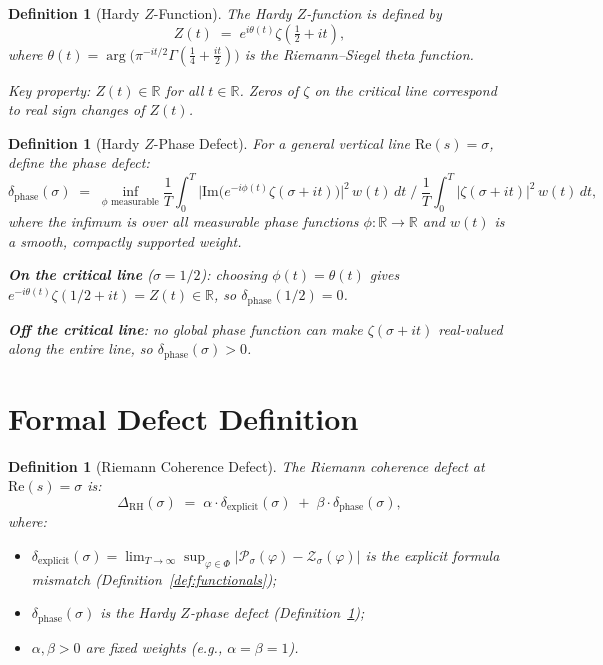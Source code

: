 \documentclass[11pt]{article}
\newtheorem{definition}[lemma]{Definition}
\theoremstyle{definition}
\begin{document}
\begin{definition}[Hardy $Z$-Function]
\label{def:hardy-z}
The Hardy $Z$-function is defined by
\[
  Z(t) \;=\; e^{i\theta(t)} \zeta(\tfrac{1}{2} + it),
\]
where $\theta(t) = \arg\bigl(\pi^{-it/2} \Gamma(\tfrac{1}{4} + \tfrac{it}{2})\bigr)$
is the Riemann--Siegel theta function.

Key property: $Z(t) \in \mathbb{R}$ for all $t \in \mathbb{R}$.
Zeros of $\zeta$ on the critical line correspond to real sign changes of $Z(t)$.
\end{definition}

\begin{definition}[Hardy $Z$-Phase Defect]
\label{def:phase-defect}
For a general vertical line $\mathrm{Re}(s) = \sigma$, define the \emph{phase defect}:
\[
  \delta_{\mathrm{phase}}(\sigma) \;=\; \inf_{\phi \text{ measurable}}
  \frac{1}{T} \int_0^T \bigl|\mathrm{Im}\bigl(e^{-i\phi(t)} \zeta(\sigma + it)\bigr)\bigr|^2
  \, w(t)\, dt
  \;\bigg/\;
  \frac{1}{T} \int_0^T |\zeta(\sigma + it)|^2 \, w(t)\, dt,
\]
where the infimum is over all measurable phase functions $\phi : \mathbb{R} \to \mathbb{R}$
and $w(t)$ is a smooth, compactly supported weight.

\textbf{On the critical line} ($\sigma = 1/2$): choosing $\phi(t) = \theta(t)$ gives
$e^{-i\theta(t)} \zeta(1/2 + it) = Z(t) \in \mathbb{R}$, so $\delta_{\mathrm{phase}}(1/2) = 0$.

\textbf{Off the critical line}: no global phase function can make $\zeta(\sigma + it)$
real-valued along the entire line, so $\delta_{\mathrm{phase}}(\sigma) > 0$.
\end{definition}

\section{Formal Defect Definition}

\begin{definition}[Riemann Coherence Defect]
\label{def:delta-RH}
The \emph{Riemann coherence defect} at $\mathrm{Re}(s) = \sigma$ is:
\[
  \Delta_{\mathrm{RH}}(\sigma) \;=\;
  \alpha \cdot \delta_{\mathrm{explicit}}(\sigma)
  \;+\; \beta \cdot \delta_{\mathrm{phase}}(\sigma),
\]
where:
\begin{itemize}
  \item $\delta_{\mathrm{explicit}}(\sigma) = \lim_{T \to \infty} \sup_{\varphi \in \Phi}
    |\mathcal{P}_\sigma(\varphi) - \mathcal{Z}_\sigma(\varphi)|$
    is the explicit formula mismatch (Definition~\ref{def:functionals});
  \item $\delta_{\mathrm{phase}}(\sigma)$ is the Hardy $Z$-phase defect
    (Definition~\ref{def:phase-defect});
  \item $\alpha, \beta > 0$ are fixed weights (e.g., $\alpha = \beta = 1$).
\end{itemize}
\end{definition}
\end{document}
